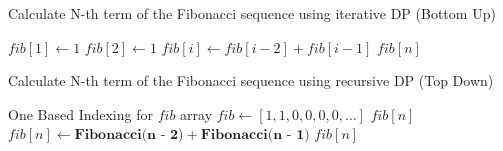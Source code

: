 \documentclass[12pt]{article}
\newcommand{\To}{\textbf{ to }}
\begin{document}
\begin{algorithm}

  \caption{Calculate N-th term of the Fibonacci sequence using iterative DP (Bottom Up)}
  \begin{algorithmic}[1]
    \Statex
        \State $fib[1] \gets 1$
        \State $fib[2] \gets 1$
        \For {$i = 3 \To n$}
            \State $fib[i] \gets fib[i - 2] + fib[i - 1]$
        \EndFor
        \Statex
        \State \Return $fib[n]$
    \EndFunction
  \end{algorithmic}
  
\end{algorithm}
\begin{algorithm}

  \caption{Calculate N-th term of the Fibonacci sequence using recursive DP (Top Down)}
  \begin{algorithmic}[1]
    \Ensure One Based Indexing for $fib$ array
    \State $fib \gets [1, 1, 0, 0, 0, 0, \dots]$
    \Statex
            \State \Return $fib[n]$
        \EndIf
        \State $fib[n] \gets \textbf{Fibonacci(n - 2)} + \textbf{Fibonacci(n - 1)}$
        \State \Return $fib[n]$
    \EndFunction
  \end{algorithmic}
\end{algorithm}
\end{document}
